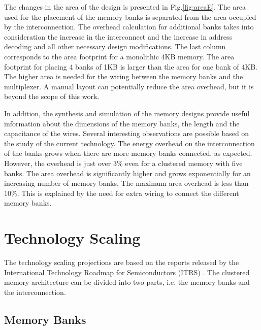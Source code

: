 The changes in the area of the design is presented in Fig.\ref{fig:areaE}.
The area used for the placement of the memory banks is separated from the area occupied by the interconnection.
The overhead calculation for additional banks takes into consideration the increase in the interconnect and the increase in address decoding and all other necessary design modifications.
The last column corresponds to the area footprint for a monolithic 4KB memory.
The area footprint for placing 4 banks of 1KB is larger than the area for one bank of 4KB.
The higher area is needed for the wiring between the memory banks and the multiplexer.
A manual layout can potentially reduce the area overhead, but it is beyond the scope of this work.

In addition, the synthesis and simulation of the memory designs provide useful information about the dimensions of the memory banks, the length and the capacitance of the wires.
Several interesting observations are possible based on the study of the current technology.
The energy overhead on the interconnection of the banks grows when there are more memory banks connected, as expected.
However, the overhead is just over 3\% even for a clustered memory with five banks. 
The area overhead is significantly higher and grows exponentially for an increasing number of memory banks.  
The maximum area overhead is less than 10\%.
This is explained by the need for extra wiring to connect the different memory banks.

\section{Technology Scaling}
\label{future}

The technology scaling projections are based on the reports released by the International Technology Roadmap for Semiconductors (ITRS) \cite{itrs}.
The clustered memory architecture can be divided into two parts, i.e. the memory banks and the interconnection.

\subsection{Memory Banks}

